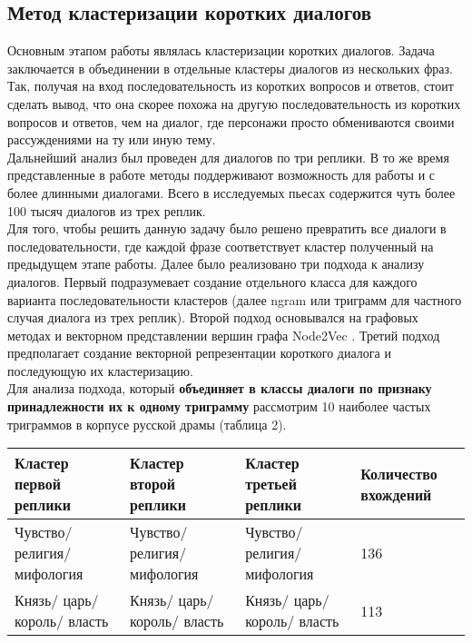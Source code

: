 \documentclass[a4paper,14pt]{article}
\begin{document}
\begin{center}
	\section*{Метод кластеризации коротких диалогов}
\end{center}
\begin{justify}
\indent
Основным этапом работы являлась кластеризации коротких диалогов. Задача заключается в объединении в отдельные кластеры диалогов из нескольких фраз. Так, получая на вход последовательность из коротких вопросов и ответов, стоит сделать вывод, что она скорее похожа на другую последовательность из коротких вопросов и ответов, чем на диалог, где персонажи просто обмениваются своими рассуждениями на ту или иную тему. \\
\indent
Дальнейший анализ был проведен для диалогов по три реплики. В то же время представленные в работе методы поддерживают возможность для работы и с более длинными диалогами. Всего в исследуемых пьесах содержится чуть более 100 тысяч диалогов из трех реплик.\\
\indent
Для того, чтобы решить данную задачу было решено превратить все диалоги в последовательности, где каждой фразе соответствует кластер полученный на предыдущем этапе работы. Далее было реализовано три подхода к анализу диалогов. Первый подразумевает создание отдельного класса для каждого варианта последовательности кластеров (далее ngram или триграмм для частного случая диалога из трех реплик). Второй подход основывался на графовых методах и векторном представлении вершин графа Node2Vec \cite{node2vec}. Третий подход предполагает создание векторной репрезентации короткого диалога и последующую их кластеризацию. \\
\indent
Для анализа подхода, который \textbf{объединяет в классы диалоги по признаку принадлежности их к одному триграмму} рассмотрим 10 наиболее частых триграммов в корпусе русской драмы (таблица 2).
\begin{center}
\begin{tabularx}{\linewidth}{ | E | E | E | E | }
\hline
Кластер первой реплики&Кластер второй реплики&Кластер третьей реплики&Количество вхождений\\\hline
Чувство/ религия/ мифология&Чувство/ религия/ мифология&Чувство/ религия/ мифология&136\\\hline
Князь/ царь/ король/ власть&Князь/ царь/ король/ власть&Князь/ царь/ король/ власть&113\\\hline

\end{tabularx}
\end{center}
\end{justify}
\end{document}
